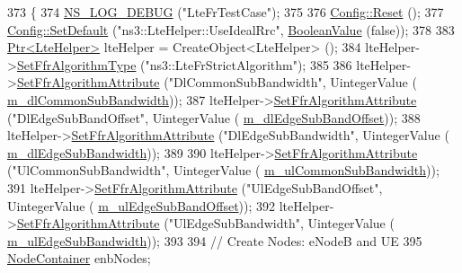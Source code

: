 \begin{DoxyCode}
373 \{
374   \hyperlink{group__logging_ga413f1886406d49f59a6a0a89b77b4d0a}{NS\_LOG\_DEBUG} (\textcolor{stringliteral}{"LteFrTestCase"});
375 
376   \hyperlink{group__config_ga2c1b65724f42f8c72276d7e7ad6df6db}{Config::Reset} ();
377   \hyperlink{group__config_ga2e7882df849d8ba4aaad31c934c40c06}{Config::SetDefault} (\textcolor{stringliteral}{"ns3::LteHelper::UseIdealRrc"}, 
      \hyperlink{classns3_1_1BooleanValue}{BooleanValue} (\textcolor{keyword}{false}));
378 
383   \hyperlink{classns3_1_1Ptr}{Ptr<LteHelper>} lteHelper = CreateObject<LteHelper> ();
384   lteHelper->\hyperlink{classns3_1_1LteHelper_a035c6b03305c1511975362f80425b5fc}{SetFfrAlgorithmType} (\textcolor{stringliteral}{"ns3::LteFrStrictAlgorithm"});
385 
386   lteHelper->\hyperlink{classns3_1_1LteHelper_a793d56e843a844428851e90752c5f130}{SetFfrAlgorithmAttribute} (\textcolor{stringliteral}{"DlCommonSubBandwidth"}, UintegerValue (
      \hyperlink{classLteStrictFrTestCase_ade1216e9161be5712e6c7e9101589179}{m\_dlCommonSubBandwidth}));
387   lteHelper->\hyperlink{classns3_1_1LteHelper_a793d56e843a844428851e90752c5f130}{SetFfrAlgorithmAttribute} (\textcolor{stringliteral}{"DlEdgeSubBandOffset"}, UintegerValue (
      \hyperlink{classLteStrictFrTestCase_a868cea1d757a5a1242367ae2e2586fed}{m\_dlEdgeSubBandOffset}));
388   lteHelper->\hyperlink{classns3_1_1LteHelper_a793d56e843a844428851e90752c5f130}{SetFfrAlgorithmAttribute} (\textcolor{stringliteral}{"DlEdgeSubBandwidth"}, UintegerValue (
      \hyperlink{classLteStrictFrTestCase_a58d600143fb7070864722d3fcbb74d35}{m\_dlEdgeSubBandwidth}));
389 
390   lteHelper->\hyperlink{classns3_1_1LteHelper_a793d56e843a844428851e90752c5f130}{SetFfrAlgorithmAttribute} (\textcolor{stringliteral}{"UlCommonSubBandwidth"}, UintegerValue (
      \hyperlink{classLteStrictFrTestCase_a11cec568aeb868ad01cb3ae2404b59bb}{m\_ulCommonSubBandwidth}));
391   lteHelper->\hyperlink{classns3_1_1LteHelper_a793d56e843a844428851e90752c5f130}{SetFfrAlgorithmAttribute} (\textcolor{stringliteral}{"UlEdgeSubBandOffset"}, UintegerValue (
      \hyperlink{classLteStrictFrTestCase_a92234751b6af7f82f3c576288619bbb2}{m\_ulEdgeSubBandOffset}));
392   lteHelper->\hyperlink{classns3_1_1LteHelper_a793d56e843a844428851e90752c5f130}{SetFfrAlgorithmAttribute} (\textcolor{stringliteral}{"UlEdgeSubBandwidth"}, UintegerValue (
      \hyperlink{classLteStrictFrTestCase_acef297528c21c8a9255794ecb0150b04}{m\_ulEdgeSubBandwidth}));
393 
394   \textcolor{comment}{// Create Nodes: eNodeB and UE}
395   \hyperlink{classns3_1_1NodeContainer}{NodeContainer} enbNodes;

\end{DoxyCode}

